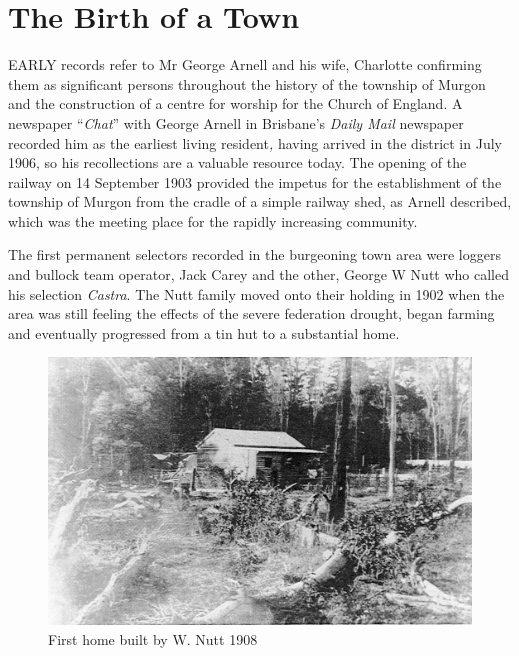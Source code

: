 \balance


\printendnotes[custom]
\setcounter{endnote}{0}
\chapter{The Birth of a Town}
\nobalance


\lettrine[lines=3]{E}{ARLY}
 records refer to Mr George Arnell and his wife, Charlotte confirming them as significant persons throughout the history of the township of Murgon and the construction of a centre for worship for the Church of England. A newspaper ``\emph{Chat}'' with George Arnell in Brisbane's \emph{Daily Mail} newspaper recorded him as the earliest living resident\emph{,} having arrived in the district in July 1906, so his recollections are a valuable resource today. The opening of the railway on 14 September 1903 provided the impetus for the establishment of the township of Murgon from the cradle of a simple railway shed, as Arnell described, which was the meeting place for the rapidly increasing community.

The first permanent selectors recorded in the burgeoning town area were loggers and bullock team operator, Jack Carey and the other, George W Nutt who called his selection \emph{Castra}. The Nutt family moved onto their holding in 1902 when the area was still feeling the effects of the severe federation drought, began farming and eventually progressed from a tin hut to a substantial home.









\begin{figure}
\begin{center}
\includegraphics[width=1.\linewidth,center]{../images/HouseWNutt1908.jpg}
\caption{First home built by W. Nutt 1908}
\end{center}
\end{figure}




